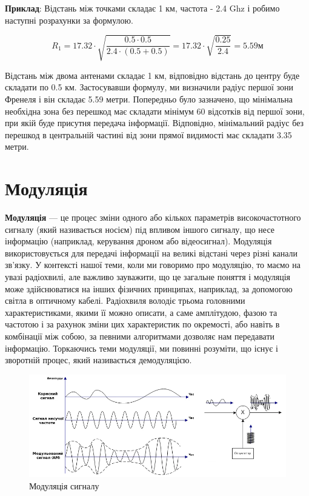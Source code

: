 \documentclass{article}
\begin{document}
\textbf{Приклад}: Відстань між точками складає 1 км, частота - 2.4 Ghz і робимо наступні розрахунки за формулою.

\[
R_1 = 17.32 \cdot \sqrt{\frac{0.5 \cdot 0.5}{2.4 \cdot (0.5 + 0.5)}}=17.32 \cdot \sqrt {\frac{0.25}{2.4}}=5.59 м
\]

Відстань між двома антенами складає 1 км, відповідно відстань до центру буде складати по 0.5 км. Застосувавши формулу, ми визначили радіус першої зони Френеля і він складає 5.59 метри. Попередньо було зазначено, що мінімальна необхідна зона без перешкод має складати мінімум 60 відсотків від першої зони, при якій буде присутня передача інформації. Відповідно, мінімальний радіус без перешкод в центральній частині від зони прямої видимості має складати 3.35 метри.


\section{Модуляція}
\label{sec:modulation}

\textbf{Модуляція} --- це процес зміни одного або кількох параметрів високочастотного сигналу (який називається носієм) під впливом іншого сигналу, що несе інформацію (наприклад, керування дроном або відеосигнал). Модуляція використовується для передачі інформації на великі відстані через різні канали зв'язку. У контексті нашої теми, коли ми говоримо про модуляцію, то маємо на увазі радіохвилі, але важливо зауважити, що це загальне поняття і модуляція може здійснюватися на інших фізичних принципах, наприклад, за допомогою світла в оптичному кабелі. Радіохвиля володіє трьома головними характеристиками, якими її можно описати, а саме амплітудою, фазою та частотою і за рахунок зміни цих характеристик по окремості, або навіть в комбінації між собою, за певними алгоритмами дозволяє нам передавати інформацію. Торкаючись теми модуляції, ми повинні розуміти, що існує і зворотній процес, який називається демодуляцією. 

\begin{figure}[h!]
	\centering
	\includegraphics[width=0.9\linewidth]{images/modulation_signal.png}
	\caption{\label{fig:modulation_signal} Модуляція сигналу}
\end{figure}
\end{document}
